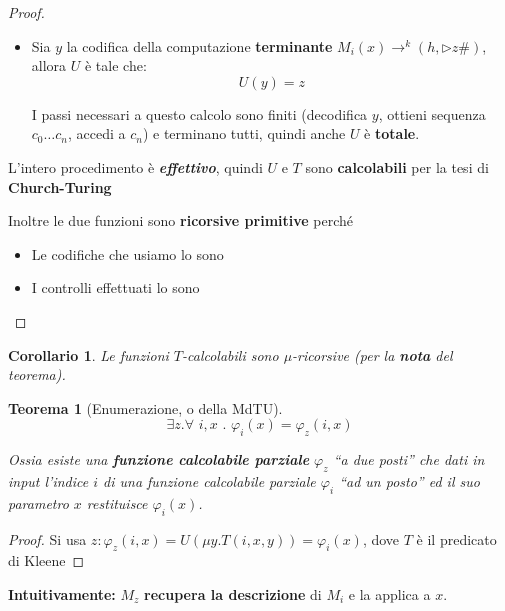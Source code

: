 \documentclass[a4paper,10pt,oneside]{article}
\theoremstyle{break}
\newtheorem{teo}{Teorema}[subsection]
\newtheorem{cor}{Corollario}[teo]
\begin{document}
\begin{mdframed}
\begin{proof}
\begin{itemize}
 \item Sia $y$ la codifica della computazione \textbf{terminante} $M_i(x) \to ^k (h, \triangleright z \#)$, allora $U$ è tale che: \[U(y) = z\]

 I passi necessari a questo calcolo sono finiti (decodifica $y$, ottieni sequenza $c_0\hdots c_n$, accedi a $c_n$) e terminano tutti, quindi anche $U$ è \textbf{totale}.

\end{itemize}

L'intero procedimento è \emph{\textbf{effettivo}}, quindi $U$ e $T$ sono \textbf{calcolabili} per la tesi di \textbf{Church-Turing}

Inoltre le due funzioni sono \textbf{ricorsive primitive} perché

\begin{itemize}
 \item Le codifiche che usiamo lo sono
 \item I controlli effettuati lo sono
\end{itemize}


\end{proof}
\begin{cor}
Le funzioni $T$-calcolabili sono $\mu$-ricorsive (per la \textbf{nota} del teorema).
\end{cor}

\end{mdframed}

\newpage

\begin{mdframed}
\begin{teo}[Enumerazione, o della MdTU]
 \[ \exists z . \forall \,\,i, x\,\, . \,\,\varphi_i(x) = \varphi_z(i, x) \]

 Ossia esiste una \textbf{funzione calcolabile parziale} $\varphi_z$ ``a due posti'' che dati in input l'indice $i$ di una funzione calcolabile parziale $\varphi_i$ ``ad un posto'' ed il suo parametro $x$ restituisce $\varphi_i(x)$.
\end{teo}

\dotfill

\begin{proof}
Si usa $z : \varphi_z(i, x) = U(\mu y . T (i, x, y)) = \varphi_i(x)$, dove $T$ è il predicato di Kleene
\end{proof}

\dotfill\smallskip

\textbf{Intuitivamente:} $M_z$ \textbf{recupera la descrizione} di $M_i$ e la applica a $x$.\newpage


\end{mdframed}
\end{document}
